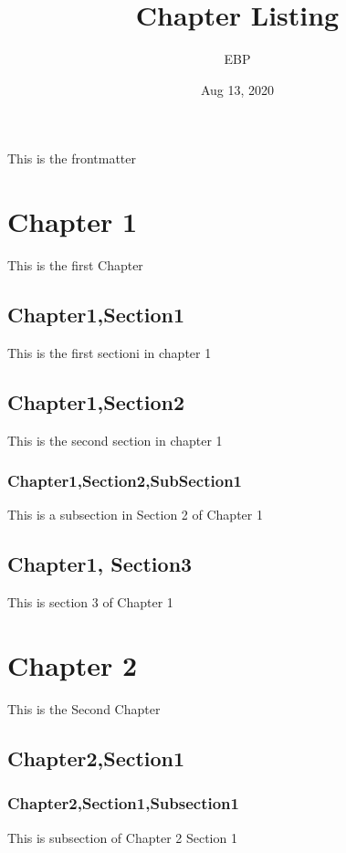 \documentclass[letterpaper,10pt,english]{sphinxmanual}
\title{Chapter Listing}
\date{Aug 13, 2020}
\author{EBP}
\begin{document}
\pagestyle{empty}
\sphinxmaketitle
\pagestyle{plain}
\sphinxtableofcontents
\pagestyle{normal}
\label{\detokenize{intro::doc}}


This is the frontmatter


\chapter{Chapter 1}
\label{\detokenize{chapter1:chapter-1}}\label{\detokenize{chapter1::doc}}
This is the first Chapter


\section{Chapter1,Section1}
\label{\detokenize{chapter1:chapter1-section1}}
This is the first sectioni in chapter 1


\section{Chapter1,Section2}
\label{\detokenize{chapter1:chapter1-section2}}
This is the second section in chapter 1


\subsection{Chapter1,Section2,SubSection1}
\label{\detokenize{chapter1:chapter1-section2-subsection1}}
This is a subsection in Section 2 of Chapter 1


\section{Chapter1, Section3}
\label{\detokenize{chapter1:chapter1-section3}}
This is section 3 of Chapter 1


\chapter{Chapter 2}
\label{\detokenize{chapter2:chapter-2}}\label{\detokenize{chapter2::doc}}
This is the Second Chapter


\section{Chapter2,Section1}
\label{\detokenize{chapter2:chapter2-section1}}

\subsection{Chapter2,Section1,Subsection1}
\label{\detokenize{chapter2:chapter2-section1-subsection1}}
This is subsection of Chapter 2 Section 1
\end{document}

